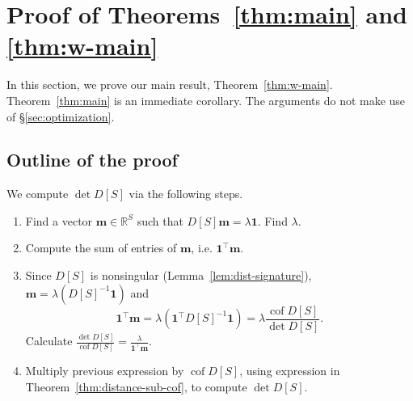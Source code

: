 \documentclass[12pt]{amsart}
\theoremstyle{definition}
\newtheorem{eg}[thm]{Example}
\newcommand{\RR}{\mathbb{R}}
\newcommand{\bone}{\mathbf{1}}
\newcommand{\boldm}{\mathbf{m}}
\newcommand{\tr}{\intercal}
\DeclareMathOperator{\cof}{cof}
\newcommand\farbod[1]{\footnote{[\textcolor{orange}{(Farbod)} \textcolor{blue}{#1}]}}
\begin{document}
\section{Proof of Theorems~\ref{thm:main} and \ref{thm:w-main}}
\label{sec:distance_proofs}

In this section, we prove our main result, Theorem~\ref{thm:w-main}.
Theorem~\ref{thm:main} is an immediate corollary.
The arguments do not make use of \S\ref{sec:optimization}.

\subsection{Outline of the proof}

We compute $\det D[S]$ via the following steps.

\begin{enumerate}[label=(\Roman*)]
\item
Find a vector $\boldm \in \RR^S$ such that $D[S]\boldm = \lambda \bone$.
Find $\lambda$.

\item 
Compute the sum of entries of $\boldm$, i.e. $\bone^\tr \boldm$.

\item 
Since $D[S]$ is nonsingular (Lemma~\ref{lem:dist-signature}), $\boldm = \lambda (D[S]^{-1} \bone)$ and
\[
	\bone^\tr \boldm = \lambda (\bone^\tr D[S]^{-1} \bone) = \lambda \frac{\cof D[S]}{\det D[S]}.
\]
Calculate $\displaystyle \frac{\det D[S]}{\cof D[S]} = \frac{\lambda}{\bone^\tr \boldm}$.



\item
Multiply previous expression by $\cof D[S]$, using expression in Theorem~\ref{thm:distance-sub-cof}, to compute $\det D[S]$.
\end{enumerate}

	
\end{document}
